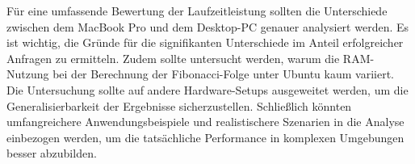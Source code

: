 \noindent
Für eine umfassende Bewertung der Laufzeitleistung sollten die Unterschiede zwischen dem MacBook Pro und dem Desktop-PC genauer analysiert werden. Es ist wichtig, die Gründe für die signifikanten Unterschiede im Anteil erfolgreicher Anfragen zu ermitteln. Zudem sollte untersucht werden, warum die RAM-Nutzung bei der Berechnung der Fibonacci-Folge unter Ubuntu kaum variiert. Die Untersuchung sollte auf andere Hardware-Setups ausgeweitet werden, um die Generalisierbarkeit der Ergebnisse sicherzustellen.  Schließlich könnten umfangreichere Anwendungsbeispiele und realistischere Szenarien in die Analyse einbezogen werden, um die tatsächliche Performance in komplexen Umgebungen besser abzubilden.